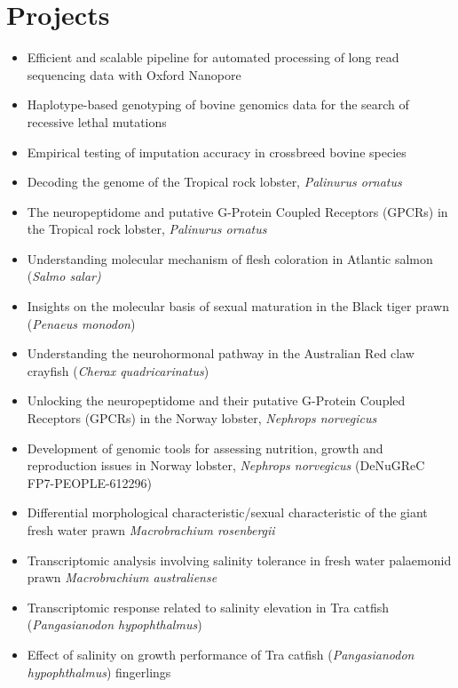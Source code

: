 \documentclass[letterpaper,11pt]{article}
\newcommand{\resumeBlack}[1]{\item\small{{#1}}}
\newcommand{\resumeItemListStart}{\begin{itemize}}
\newcommand{\resumeItemListEnd}{\end{itemize}}
\begin{document}
\section{Projects}
  \resumeItemListStart
    \resumeBlack{Efficient and scalable pipeline for automated processing of long read sequencing data with Oxford Nanopore}  
    \resumeBlack{Haplotype-based genotyping of bovine genomics data for the search of recessive lethal mutations}  
    \resumeBlack{Empirical testing of imputation accuracy in crossbreed bovine species}
    \resumeBlack{Decoding the genome of the Tropical rock lobster, \textit{Palinurus ornatus}}
    \resumeBlack{The neuropeptidome and putative G-Protein Coupled Receptors (GPCRs) in the Tropical rock lobster, \textit{Palinurus ornatus}}
    \resumeBlack{Understanding molecular mechanism of flesh coloration in Atlantic salmon (\textit{Salmo salar)}}
    \resumeBlack{Insights on the molecular basis of sexual maturation in the Black tiger prawn (\textit{Penaeus monodon})}
    \resumeBlack{Understanding the neurohormonal pathway in the Australian Red claw crayfish (\textit{Cherax quadricarinatus})}
    \resumeBlack{Unlocking the neuropeptidome and their putative G-Protein Coupled Receptors (GPCRs) in the Norway lobster, \textit{Nephrops norvegicus}}
    \resumeBlack{Development of genomic tools for assessing nutrition, growth and reproduction issues in Norway lobster, \textit{Nephrops norvegicus} (DeNuGReC FP7-PEOPLE-612296)}
    \resumeBlack{Differential morphological characteristic/sexual characteristic of the giant fresh water prawn \textit{Macrobrachium rosenbergii}}
    \resumeBlack{Transcriptomic analysis involving salinity tolerance in fresh water palaemonid prawn \textit{Macrobrachium australiense}}
    \resumeBlack{Transcriptomic response related to salinity elevation in Tra catfish (\textit{Pangasianodon hypophthalmus})}
    \resumeBlack{Effect of salinity on growth performance of Tra catfish (\textit{Pangasianodon hypophthalmus}) fingerlings}
  \resumeItemListEnd

  
\end{document}
